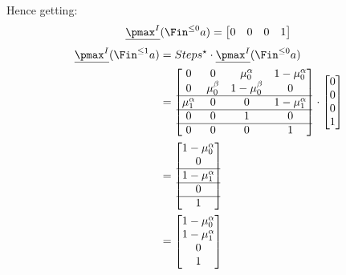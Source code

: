Hence getting:
\[
	\underline{\pmax^I}(\Fin^{\le 0} a) = \begin{bmatrix} 0 & 0 & 0 & 1 \end{bmatrix}
\]
\begin{align*}
	\underline{\pmax^I}(\Fin^{\le 1} a) & = Steps^\star \cdot \underline{\pmax^I}(\Fin^{\le 0} a)              \\
	                                    & = \begin{bmatrix}
		                                        0            & 0           & \mu_0^\alpha  & 1-\mu_0^\alpha \\
		                                        0            & \mu_0^\beta & 1-\mu_0^\beta & 0              \\
		                                        \hline
		                                        \mu_1^\alpha & 0           & 0             & 1-\mu_1^\alpha \\
		                                        \hline
		                                        0            & 0           & 1             & 0              \\
		                                        \hline
		                                        0            & 0           & 0             & 1              \\
	                                        \end{bmatrix} \cdot \begin{bmatrix} 0 \\ 0 \\ 0 \\ 1 \end{bmatrix} \\
	                                    & = \begin{bmatrix}
		                                        1-\mu_0^\alpha   \\
		                                        0                \\
		                                        \hline
		                                        1 - \mu_1^\alpha \\
		                                        \hline
		                                        0                \\
		                                        \hline
		                                        1
	                                        \end{bmatrix}                                                   \\
	                                    & = \begin{bmatrix}
		                                        1-\mu_0^\alpha   \\
		                                        1 - \mu_1^\alpha \\
		                                        0                \\
		                                        1
	                                        \end{bmatrix}
\end{align*}
